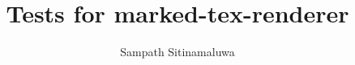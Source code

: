 \documentclass[12pt]{book}
\begin{document}
\title{Tests for marked-tex-renderer}
\author{Sampath Sitinamaluwa}

\maketitle


\end{document}
